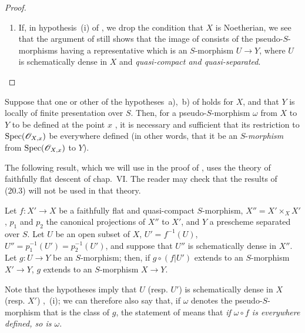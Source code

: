 \begin{proof}
\begin{remarks}[20.3.8.7]
\begin{enumerate}[label=(\roman*)]
  \item If, in hypothesis~(i) of , we drop the condition that $X$ is Noetherian, we see that the argument of  still shows that the image of  consists of the pseudo-$S$-morphisms having a representative which is an $S$-morphism $U\to Y$, where $U$ is schematically dense in $X$ and \emph{quasi-compact and quasi-separated}.
\end{enumerate}
\end{remarks}
\end{proof}

\begin{corollary}[20.3.9]
\label{IV.20.3.9}
Suppose that one or other of the hypotheses~\textup{a)},~\textup{b)} of  holds for $X$, and that $Y$ is locally of finite presentation over $S$.
Then, for a pseudo-$S$-morphism $\omega$ from $X$ to $Y$ to be defined at the point $x$ , it is necessary and sufficient that its restriction to $\operatorname{Spec}(\mathscr{O}_{X,x})$ be everywhere defined \textup{(in other words, that it be an $S$-\emph{morphism} from $\operatorname{Spec}(\mathscr{O}_{X,x})$ to $Y$)}.
\end{corollary}

The following result, which we will use in the proof of , uses the theory of faithfully flat descent of chap.~VI.
The reader may check that the results of (20.3) will not be used in that theory.

\begin{lemma}[20.3.10]
\label{IV.20.3.10}
Let $f:X'\to X$ be a faithfully flat and quasi-compact $S$-morphism, $X''=X'\times_X X'$, $p_1$ and $p_2$ the canonical projections of $X''$ to $X'$, and $Y$ a prescheme separated over $S$.
Let $U$ be an open subset of $X$, $U'=f^{-1}(U)$, $U''=p_1^{-1}(U')=p_2^{-1}(U')$, and suppose that $U''$ is schematically dense in $X''$.
Let $g:U\to Y$ be an $S$-morphism; then, if $g\circ(f|U')$ extends to an $S$-morphism $X'\to Y$, $g$ extends to an $S$-morphism $X\to Y$.
\end{lemma}

Note that the hypotheses imply that $U$ (resp. $U'$) is schematically dense in $X$ (resp. $X'$) ,~(i); we can therefore also say that, if $\omega$ denotes the pseudo-$S$-morphism that is the class of $g$, the statement of  means that \emph{if $\omega\circ f$ is everywhere defined, so is $\omega$}.

